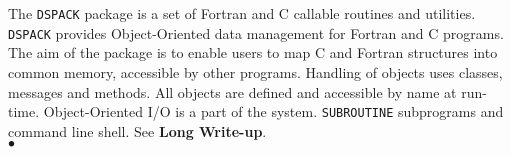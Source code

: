                         
                        
                     
The {\tt DSPACK} package is a set of Fortran and C callable routines
and utilities.
{\tt DSPACK} provides Object-Oriented data management for Fortran
and C programs. The aim of the package is to enable users to map
C and Fortran structures into common memory, accessible by other
programs. Handling of objects uses classes, messages and methods.
All objects are defined and accessible by name at run-time.
Object-Oriented I/O is a part of the system.
\Structure
{\tt SUBROUTINE} subprograms and command line shell.
\Usage
See {\bf Long Write-up}.
\\ $\bullet$ 
